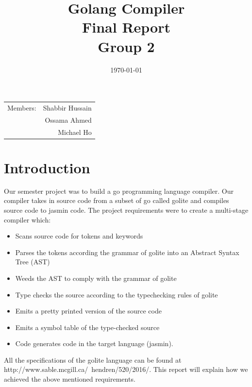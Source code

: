 \documentclass{article}
\title{Golang Compiler\\ Final Report\\ Group 2} %
\date{\today} %
\begin{document}
\maketitle %

\begin{center}
\begin{tabular}{l r}
Members: & Shabbir Hussain \\ %
& Ossama Ahmed \\ %
& Michael Ho \\ \end{tabular}
\end{center}

\section{Introduction}
Our semester project was to build a go programming language compiler. Our compiler takes in source code from a subset of go called golite and compiles source code to jasmin code. The project requirements were to create a multi-stage compiler which:

\begin{itemize}
\item Scans source code for tokens and keywords
\item Parses the tokens according the grammar of golite into an Abstract Syntax Tree (AST)
\item Weeds the AST to comply with the grammar of golite
\item Type checks the source according to the typechecking rules of golite
\item Emits a pretty printed version of the source code
\item Emits a symbol table of the type-checked source
\item Code generates code in the target language (jasmin).
\end{itemize}

All the specifications of the golite language can be found at http://www.sable.mcgill.ca/~hendren/520/2016/.
This report will explain how we achieved the above mentioned requirements. 
\end{document}
